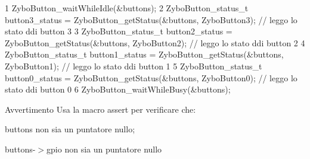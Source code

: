 \begin{DoxyCode}
1 ZyboButton\_waitWhileIdle(&buttons);
2 ZyboButton\_status\_t button3\_status = ZyboButton\_getStatus(&buttons, ZyboButton3);               // leggo lo
       stato ddi button 3
3 ZyboButton\_status\_t button2\_status = ZyboButton\_getStatus(&buttons, ZyboButton2);               // leggo lo
       stato ddi button 2
4 ZyboButton\_status\_t button1\_status = ZyboButton\_getStatus(&buttons, ZyboButton1);               // leggo lo
       stato ddi button 1
5 ZyboButton\_status\_t button0\_status = ZyboButton\_getStatus(&buttons, ZyboButton0);               // leggo lo
       stato ddi button 0
6 ZyboButton\_waitWhileBusy(&buttons);
\end{DoxyCode}


\begin{DoxyWarning}{Avvertimento}
Usa la macro assert per verificare che\+:
\begin{DoxyItemize}
\item buttons non sia un puntatore nullo;
\item buttons-\/$>$gpio non sia un puntatore nullo 
\end{DoxyItemize}
\end{DoxyWarning}
